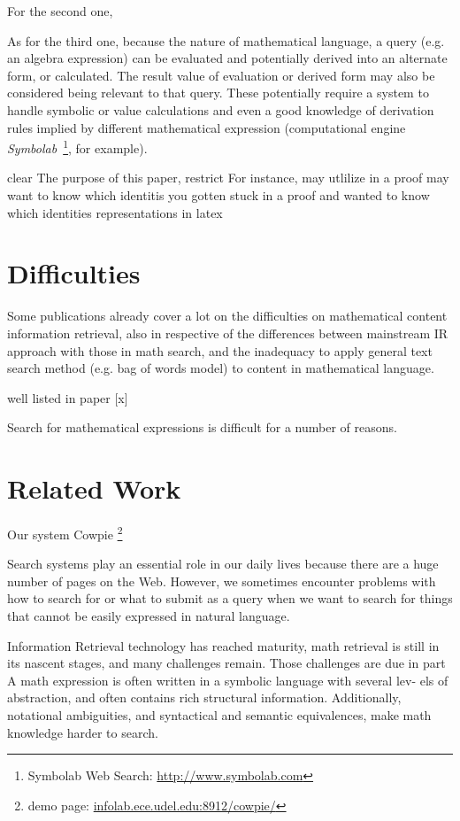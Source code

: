 For the second one,

As for the third one, because the nature of mathematical language, a query (e.g. an algebra expression) can be evaluated and potentially derived into an alternate form, or calculated. 
The result value of evaluation or derived form may also be considered being relevant to that query. 
These potentially require a system to handle symbolic or value calculations and even a good knowledge of derivation rules implied by different mathematical expression
(computational engine \textit{Symbolab}~\footnote{Symbolab Web Search: \url{http://www.symbolab.com}}, for example).


clear The purpose of this paper,  restrict
For instance,  may utlilize in a proof may want to know which identitis
you gotten stuck in a proof and wanted to know which identities
representations in latex

\section{Difficulties}
\label{difficulties}
Some publications already cover a lot on the difficulties on mathematical content information retrieval, also in respective of the differences between mainstream IR approach with those in math search, and the inadequacy to apply general text search method (e.g. bag of words model) to content in mathematical language.

well listed in paper [x]

Search for mathematical expressions is difficult for a number of reasons.

\section{Related Work}

Our system Cowpie \footnote{demo page: \url{infolab.ece.udel.edu:8912/cowpie/}} \cite{WolframAlpha}

Search systems play an essential role in our daily lives because there are
a huge number of pages on the Web. However, we sometimes encounter
problems with how to search for or what to submit as a query when we
want to search for things that cannot be easily expressed in natural language.

Information Retrieval technology has reached maturity, math retrieval is still in
its nascent stages, and many challenges remain. Those challenges are due in part
A math expression is often written in a symbolic language with several lev-
els of abstraction, and often contains rich structural information. Additionally,
notational ambiguities, and syntactical and semantic equivalences, make math
knowledge harder to search.


